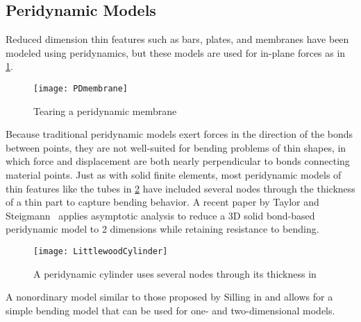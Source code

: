 \subsection{Peridynamic Models}
Reduced dimension thin features such as bars\cite{silling2003deformation,weckner2005effect,emmrich2007analysis,mikata2012analytical}, plates\cite{kilic2009prediction}, and membranes\cite{silling2005peridynamic} have been modeled using peridynamics, but these models are used for in-plane forces as in \cref{fig:PDmembrane}.
%
\begin{figure}[h]
  \centering
\texttt{[image: PDmembrane]}
\caption[Tearing a peridynamic membrane]{Tearing a peridynamic membrane \cite{silling2005peridynamic}}
\label{fig:PDmembrane}
\end{figure}
%
Because traditional peridynamic models exert forces in the direction of the bonds between points, they are not well-suited for bending problems of thin shapes, in which force and displacement are both nearly perpendicular to bonds connecting material points.
Just as with solid finite elements, most peridynamic models of thin features like the tubes in \cref{fig:LittlewoodCylinder} have included several nodes through the thickness of a thin part to capture bending behavior.
A recent paper by Taylor and Steigmann~\cite{taylor2013two} applies asymptotic analysis to reduce a 3D solid bond-based peridynamic model to 2 dimensions while retaining resistance to bending.
%
\begin{figure}[h!]
  \centering
\texttt{[image: LittlewoodCylinder]}
\caption[A peridynamic cylinder uses several nodes through its thickness]{A peridynamic cylinder uses several nodes through its thickness in \cite{littlewood2010simulation}}
\label{fig:LittlewoodCylinder}
\end{figure}
%
A nonordinary model similar to those proposed by Silling in \cite{silling2007peridynamic} and \cite{silling2010peridynamic} allows for a simple bending model that can be used for one- and two-dimensional models.

